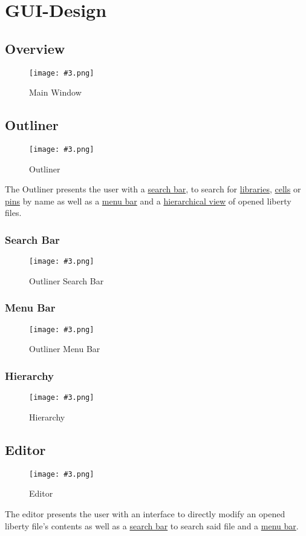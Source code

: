 \documentclass[10pt,a4paper]{report}
\newcommand{\refer}[2]{\hyperref[#1]{\textcolor{col:reference}{#2}}}
\newcommand{\h}[1]{\textcolor{col:highlight}{#1}}
\newcommand{\refg}[2]{\refer{glo:#1}{#2}}
\newcommand{\includeimage}[5]{
    \begin{figure}[H]
        #1
        \texttt{[image: \#3.png]}
        \caption{#4}
        \label{fig:#5}
    \end{figure}
}
\begin{document}
\chapter{GUI-Design}
\section{Overview}
\includeimage{}{0.4}{Main Window}{Main Window}{main_window}

\section{Outliner}
\label{sec:outliner}
\includeimage{}{0.4}{Outliner}{Outliner}{outliner}
The \h{Outliner} presents the user with a \refer{sec:outliner:search}{search bar}, to search for \refg{library}{libraries}, \refg{cell}{cells} or \refg{pin}{pins} by name as well as a \refer{sec:outliner:menu}{menu bar} and a \refer{sec:outliner:hierarchy}{hierarchical view} of opened liberty files.

\subsection{Search Bar}
\label{sec:outliner:search}

\includeimage{}{0.4}{Outliner Search Bar}{Outliner Search Bar}{outliner_search_bar}

\subsection{Menu Bar}
\label{sec:outliner:menu}

\includeimage{}{0.4}{Outliner Menu Bar}{Outliner Menu Bar}{outliner_menu_bar}

\subsection{Hierarchy}
\label{sec:outliner:hierarchy}

\includeimage{}{0.4}{Hierarchy}{Hierarchy}{hierarchy}

\section{Editor}
\label{sec:editor}
\includeimage{}{0.4}{Editor}{Editor}{editor}
The \h{editor} presents the user with an interface to directly modify an opened liberty file's contents as well as a \refer{sec:editor:search}{search bar} to search said file and a \refer{sec:editor:menu}{menu bar}.
\end{document}
